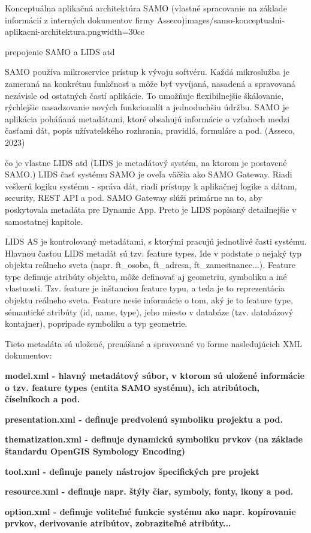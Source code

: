 {Konceptuálna aplikačná architektúra SAMO (vlastné spracovanie na základe informácií z interných dokumentov firmy Asseco)}{images/samo-konceptualni-aplikacni-architektura.png}{width=30cc}

\TODO prepojenie SAMO a LIDS atd

SAMO používa mikroservice prístup k vývoju softvéru. Každá mikroslužba je zameraná na konkrétnu funkčnosť a môže byť vyvíjaná, nasadená a spravovaná nezávisle od ostatných častí aplikácie. To umožňuje flexibilnejšie škálovanie, rýchlejšie nasadzovanie nových funkcionalít a jednoduchšiu údržbu. SAMO je aplikácia poháňaná metadátami, ktoré obsahujú informácie o vzťahoch medzi časťami  dát, popis užívateľského rozhrania, pravidlá, formuláre a pod. \scr(Asseco, 2023)


\TODO čo je vlastne LIDS atd (LIDS je metadátový systém, na ktorom je postavené SAMO.)
LIDS časť systému SAMO je oveľa väčšia ako SAMO Gateway. Riadi veškerú logiku systému - správa dát, riadi prístupy k aplikačnej logike a dátam, security, REST API a pod. SAMO Gateway slúži primárne na to, aby poskytovala metadáta pre Dynamic App. Preto je LIDS popísaný detailnejšie v samostatnej kapitole.

LIDS AS je kontrolovaný metadátami, s ktorými pracujú jednotlivé časti systému. Hlavnou časťou LIDS metadát sú tzv. feature types. Ide v podstate o nejaký typ objektu reálneho sveta (napr. ft\_osoba, ft\_adresa, ft\_zamestnanec...). Feature type definuje atribúty objektu, môže definovať aj geometriu, symboliku a iné vlastnosti. Tzv. feature je inštanciou feature typu, a teda je to reprezentácia objektu reálneho sveta. Feature nesie informácie o tom, aký je to feature type, sémantické atribúty (id, name, type), jeho miesto v databáze (tzv. databázový kontajner), poprípade symboliku a typ geometrie.

Tieto metadáta sú uložené, prenášané a spravované vo forme nasledujúcich XML dokumentov:

\startitemize
\item{\start \bf model.xml \stop - hlavný metadátový súbor, v ktorom sú uložené informácie o tzv. feature types (entita SAMO systému), ich atribútoch, číselníkoch a pod.}
\item{\start \bf presentation.xml \stop - definuje predvolenú symboliku projektu a pod.}
\item{\start \bf thematization.xml \stop - definuje dynamickú symboliku prvkov (na základe štandardu OpenGIS Symbology Encoding)}
\item{\start \bf tool.xml \stop - definuje panely nástrojov špecifických pre projekt}
\item{\start \bf resource.xml \stop - definuje napr. štýly čiar, symboly, fonty, ikony a pod.}
\item{\start \bf option.xml \stop - definuje voliteľné funkcie systému ako napr. kopírovanie prvkov, derivovanie atribútov, zobraziteľné atribúty...}
\stopitemize 

